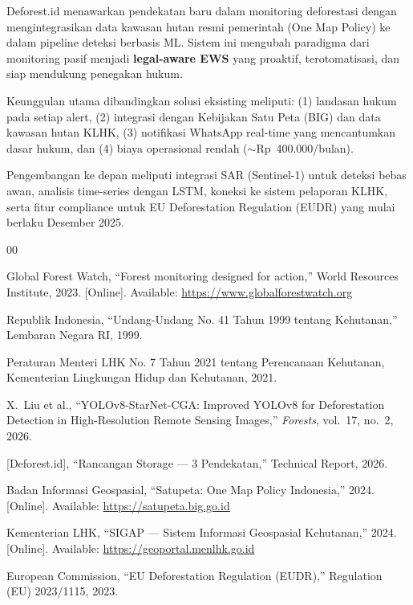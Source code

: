 \documentclass[10pt,conference,a4paper]{IEEEtran}
\begin{document}
Deforest.id menawarkan pendekatan baru dalam monitoring deforestasi
dengan mengintegrasikan data kawasan hutan resmi pemerintah (One Map
Policy) ke dalam pipeline deteksi berbasis ML. Sistem ini mengubah
paradigma dari monitoring pasif menjadi \textbf{legal-aware EWS} yang
proaktif, terotomatisasi, dan siap mendukung penegakan hukum.

Keunggulan utama dibandingkan solusi eksisting meliputi: (1) landasan
hukum pada setiap alert, (2) integrasi dengan Kebijakan Satu Peta
(BIG) dan data kawasan hutan KLHK, (3) notifikasi WhatsApp real-time
yang mencantumkan dasar hukum, dan (4) biaya operasional rendah
($\sim$Rp~400.000/bulan).

Pengembangan ke depan meliputi integrasi SAR (Sentinel-1) untuk
deteksi bebas awan, analisis time-series dengan LSTM, koneksi ke
sistem pelaporan KLHK, serta fitur compliance untuk EU Deforestation
Regulation (EUDR) yang mulai berlaku Desember 2025.

\begin{thebibliography}{00}

Global Forest Watch, ``Forest monitoring designed for action,''
World Resources Institute, 2023. [Online].
Available: \url{https://www.globalforestwatch.org}

Republik Indonesia, ``Undang-Undang No. 41 Tahun 1999 tentang
Kehutanan,'' Lembaran Negara RI, 1999.

Peraturan Menteri LHK No. 7 Tahun 2021 tentang Perencanaan
Kehutanan, Kementerian Lingkungan Hidup dan Kehutanan, 2021.

X.~Liu et al., ``YOLOv8-StarNet-CGA: Improved YOLOv8 for
Deforestation Detection in High-Resolution Remote Sensing Images,''
\emph{Forests}, vol.~17, no.~2, 2026.

[Deforest.id], ``Rancangan Storage --- 3 Pendekatan,''
Technical Report, 2026.

Badan Informasi Geospasial, ``Satupeta: One Map Policy Indonesia,'' 
2024. [Online]. Available: \url{https://satupeta.big.go.id}

Kementerian LHK, ``SIGAP --- Sistem Informasi Geospasial
Kehutanan,'' 2024. [Online].
Available: \url{https://geoportal.menlhk.go.id}

European Commission, ``EU Deforestation Regulation (EUDR),''
Regulation (EU) 2023/1115, 2023.

\end{thebibliography}
\end{document}
